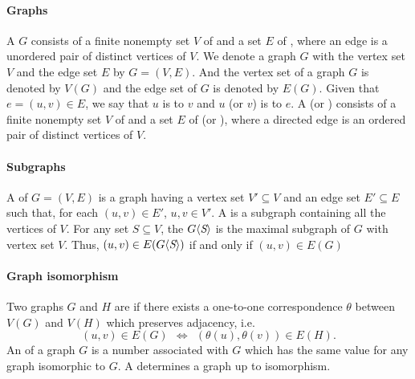 \documentclass{myproc}
\begin{document}
\small


\paragraph{Graphs}
\bit
\w A  $G$ consists of a finite nonempty set $V$ of  and
   a set $E$ of , where an edge is a unordered pair of
   distinct vertices of $V$.
\w We denote a graph $G$ with the vertex set $V$ and the edge set $E$ by 
   $G = (V, E)$. And the vertex set of a graph $G$ is denoted by $V(G)$ and
   the edge set of $G$ is denoted by $E(G)$.
\w Given that $e = (u, v) \in E$, we say that $u$ is  to $v$ and
   $u$ (or $v$) is  to $e$.
\w A  (or ) consists of a finite nonempty set
$V$ of  and a set $E$ of  (or ),
  where a directed edge is an ordered pair of distinct vertices of $V$.
\eit

\paragraph{Subgraphs}
\bit
\w A  of $G = (V, E)$ is a graph having a vertex set $V'
   \subseteq V$ and 
   an edge set $E' \subseteq E$ such that, for each $(u, v) \in E'$, 
   $u, v \in V'$.
\w A  is a subgraph containing all the vertices of $V$.
\w For any set $S \subseteq V$, the  $G\mbox{$\langle{\textit{S}}\rangle$}$ is the
maximal subgraph of $G$ with vertex set $V$.
\w Thus, $(u, v) \in E(G\mbox{$\langle{\textit{S}}\rangle$})$ if and only if $(u, v) \in E(G)$
\eit

\paragraph{Graph isomorphism}
\bit
\w Two graphs $G$ and $H$ are 
  if there exists a one-to-one correspondence $\theta$ 
  between $V(G)$ and $V(H)$
  which preserves adjacency, i.e.
   \[ (u, v) \in E(G) \ \ \Leftrightarrow\ \ 
   (\theta(u), \theta(v)) \in E(H).\]
\w An  of a graph $G$ is a number associated with $G$ which has
the same value for any graph isomorphic to $G$.
\w A  determines a graph up to isomorphism.
\eit
\end{document}
